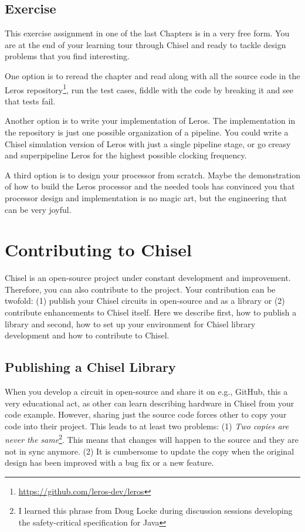 \documentclass[%
    10pt,
    headinclude, footexclude,
    openright, %
    notitlepage,
    cleardoubleempty,
    headsepline,
    pointlessnumbers,
    bibtotoc, idxtotoc,
    ]{scrbook}
\newcommand{\myref}[2]{\href{#1}{#2}}
\renewcommand{\myref}[2]{{#2}{\footnote{\url{#1}}}}
\begin{document}

\section{Exercise}

This exercise assignment in one of the last Chapters is in a very free form. You are at the end
of your learning tour through Chisel and ready to tackle design problems that
you find interesting.

One option is to reread the chapter and read along with all the source code in the
\myref{https://github.com/leros-dev/leros}{Leros repository}, run the test cases,
fiddle with the code by breaking it and see that tests fail.

Another option is to write your implementation of Leros.
The implementation in the repository is just one possible organization of a pipeline.
You could write a Chisel simulation version of Leros with just a single pipeline stage,
or go creasy and superpipeline Leros for the highest possible clocking frequency.

A third option is to design your processor from scratch. Maybe the demonstration of
how to build the Leros processor and the needed tools has convinced you that processor
design and implementation is no magic art, but the engineering that can be very joyful.

\chapter{Contributing to Chisel}


Chisel is an open-source project under constant development and improvement.
Therefore, you can also contribute to the project. Your contribution can be twofold:
(1) publish your Chisel circuits in open-source and as a library or (2) contribute
enhancements to Chisel itself.
Here we describe first, how to publish a library and second, how to
set up your environment for Chisel library development and how to contribute
to Chisel.

\section{Publishing a Chisel Library}

When you develop a circuit in open-source and share it on e.g., GitHub,
this a very educational act, as other can learn describing hardware in Chisel from your code example.
However, sharing just the source code forces other to copy your code into their
project. This leads to at least two problems: (1) \emph{Two copies are never the
same}\footnote{I learned this phrase from Doug Locke during discussion sessions
developing the safety-critical specification for Java}. This means that changes will
happen to the source and they are not in sync anymore.
(2) It is cumbersome to update the copy when the original design has been improved
with a bug fix or a new feature.
\end{document}
